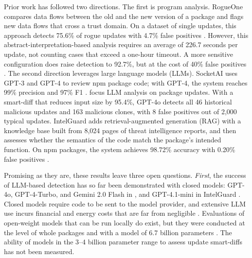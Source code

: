 \documentclass[a4paper,fleqn]{cas-dc}
\begin{document}
Prior work has followed two directions. The first is program analysis. RogueOne compares data flows between the old and the new version of a package and flags new data flows that cross a trust domain. On a dataset of single updates, this approach detects 75.6\% of rogue updates with 4.7\% false positives \citep{sofaer2024rogueone}. However, this abstract-interpretation-based analysis requires an average of 226.7 seconds per update, not counting cases that exceed a one-hour timeout. A more sensitive configuration does raise detection to 92.7\%, but at the cost of 40\% false positives \citep{sofaer2024rogueone}. The second direction leverages large language models (LLMs). SocketAI uses GPT-3 and GPT-4 to review npm package code; with GPT-4, the system reaches 99\% precision and 97\% F1 \citep{zahan2025leveraging}. \citet{wyss2025evaluating} focus LLM analysis on package updates. With a smart-diff that reduces input size by 95.4\%, GPT-4o detects all 46 historical malicious updates and 163 malicious clones, with 8 false positives out of 2,000 typical updates. IntelGuard adds retrieval-augmented generation (RAG) with a knowledge base built from 8,024 pages of threat intelligence reports, and then assesses whether the semantics of the code match the package's intended function. On npm packages, the system achieves 98.72\% accuracy with 0.20\% false positives \citep{guo2026bridging}.

Promising as they are, these results leave three open questions. \emph{First}, the success of LLM-based detection has so far been demonstrated with closed models: GPT-4o, GPT-4-Turbo, and Gemini 2.0 Flash in \citet{wyss2025evaluating}, and GPT-4.1-mini in IntelGuard \citep{guo2026bridging}. Closed models require code to be sent to the model provider, and extensive LLM use incurs financial and energy costs that are far from negligible \citep{wyss2025evaluating}. Evaluations of open-weight models that can be run locally do exist, but they were conducted at the level of whole packages and with a model of 6.7 billion parameters \citep{nguyen2025taint}. The ability of models in the 3--4 billion parameter range to assess update smart-diffs has not been measured.
\end{document}
